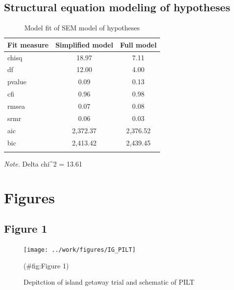 \documentclass[english,man,floatsintext]{apa6}
\begin{document}
\hypertarget{structural-equation-modeling-of-hypotheses}{%
\subsection{Structural equation modeling of hypotheses}\label{structural-equation-modeling-of-hypotheses}}

\begin{table}[tbp]

\begin{center}
\begin{threeparttable}

\caption{\label{tab:unnamed-chunk-7}Model fit of SEM model of hypotheses}

\begin{tabular}{lcc}
\toprule
Fit measure & Simplified model & Full model\\
\midrule
chisq & 18.97 & 7.11\\
df & 12.00 & 4.00\\
pvalue & 0.09 & 0.13\\
cfi & 0.96 & 0.98\\
rmsea & 0.07 & 0.08\\
srmr & 0.06 & 0.03\\
aic & 2,372.37 & 2,376.52\\
bic & 2,413.42 & 2,439.45\\
\bottomrule
\addlinespace
\end{tabular}

\begin{tablenotes}[para]
\normalsize{\textit{Note.} Delta chi\textasciicircum{}2 = 13.61}
\end{tablenotes}

\end{threeparttable}
\end{center}

\end{table}

\hypertarget{figures}{%
\section{Figures}\label{figures}}

\hypertarget{figure-1}{%
\subsection{Figure 1}\label{figure-1}}

\begin{figure}
\texttt{[image: ../work/figures/IG\_PILT]} \caption{Depitction of island getaway trial and schematic of PILT}(\#fig:Figure 1)
\end{figure}
\end{document}
